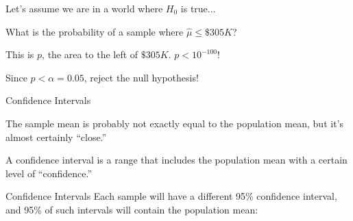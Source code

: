 \documentclass{beamer}\usepackage[]{graphicx}\usepackage[]{color}
\begin{document}
\begin{darkframes}
\begin{frame}[label=lists]{Let's assume we are in a world where $H_0$ is true...}
    \begin{center}
      What is the probability of a sample where $\hat\mu\leq\$305K$? \pause
  		
      This is $p$, the area to the left of $\$305K$. $p<10^{-100}$!  \pause
		
		  Since $p<\alpha=0.05$, reject the null hypothesis!
    \end{center}
	\end{frame}
	
	
			
			
			
			
			
			
			
			
			
		

	

	
	\begin{frame}[label=lists]{Confidence Intervals}
    \begin{center}
		The sample mean is probably not exactly equal to the population mean, but it's almost certainly ``close.'' \pause

    \bigskip
				
		A \alert{confidence interval} is a range that includes the population mean with a certain level of ``confidence.'' \pause
    \end{center}
  \end{frame}

  \begin{frame}{Confidence Intervals}
		Each sample will have a different 95\% confidence interval, and 95\% of such intervals will contain the population mean:


\end{frame}
\end{darkframes}
\end{document}
